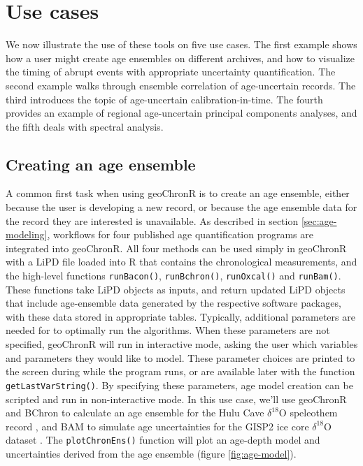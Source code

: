 \documentclass[gchron, manuscript]{copernicus}
\begin{document}
\hypertarget{sec:use-cases}{%
\section{Use cases}\label{sec:use-cases}}

We now illustrate the use of these tools on five use cases.
The first example shows how a user might create age ensembles on different archives, and how to visualize the timing of abrupt events with appropriate uncertainty quantification.
The second example walks through ensemble correlation of age-uncertain records.
The third introduces the topic of age-uncertain calibration-in-time.
The fourth provides an example of regional age-uncertain principal components analyses, and the fifth deals with spectral analysis.

\subsection{Creating an age ensemble}

A common first task when using geoChronR is to create an age ensemble, either because the user is developing a new record, or because the age ensemble data for the record they are interested is unavailable.
As described in section \ref{sec:age-modeling}, workflows for four published age quantification programs are integrated into geoChronR.
All four methods can be used simply in geoChronR with a LiPD file loaded into R that contains the chronological measurements, and the high-level functions \texttt{runBacon()}, \texttt{runBchron()}, \texttt{runOxcal()} and \texttt{runBam()}.
These functions take LiPD objects as inputs, and return updated LiPD objects that include age-ensemble data generated by the respective software packages, with these data stored in appropriate tables.
Typically, additional parameters are needed for to optimally run the algorithms.
When these parameters are not specified, geoChronR will run in interactive mode, asking the user which variables and parameters they would like to model.
These parameter choices are printed to the screen during while the program runs, or are available later with the function \texttt{getLastVarString()}.
By specifying these parameters, age model creation can be scripted and run in non-interactive mode.
In this use case, we'll use geoChronR and BChron \citep{parnell2008flexible} to calculate an age ensemble for the Hulu Cave \(\delta^{18}\)O speleothem record \citep{hulu2001}, and BAM \citep{BAM} to simulate age uncertainties for the GISP2 ice core \(\delta^{18}\)O dataset \citep{alley}.
The \texttt{plotChronEns()} function will plot an age-depth model and uncertainties derived from the age ensemble (figure \ref{fig:age-model}).
\end{document}
